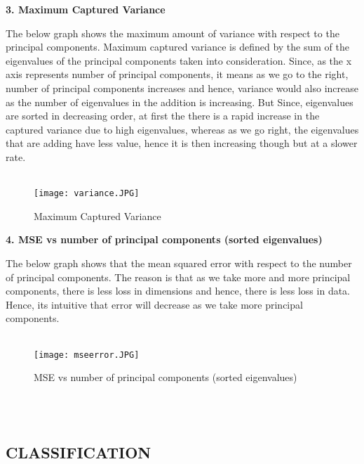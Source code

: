 \documentclass{article}
\begin{document}
    \newpage
    \textbf{ 3. Maximum Captured Variance  } 
    \begin{itemize}
       
       The below graph shows the maximum amount of variance with respect to the principal components. Maximum captured variance is defined by the sum of the eigenvalues of the principal components taken into consideration. Since, as the x axis represents number of principal components, it means as we go to the right, number of principal components increases and hence, variance would also increase as the number of eigenvalues in the addition is increasing. But Since, eigenvalues are sorted in decreasing order, at first the there is a rapid increase in the captured variance due to high eigenvalues, whereas as we go right, the eigenvalues that are adding have less value, hence it is then increasing though but at a slower rate. \\ \\
   
     \begin{figure}[H]
     \centering
      \texttt{[image: variance.JPG]}
    \caption{Maximum Captured Variance }
    \label{fig:Caption}
    \end{figure}

    \end{itemize}
    
   \newpage
    \textbf{ 4. MSE vs number of principal components (sorted eigenvalues) } 
    \begin{itemize}
       
       The below graph shows that the mean squared error with respect to the number of principal components. The reason is that as we take more and more principal components, there is less loss in dimensions and hence, there is less loss in data. Hence, its intuitive that error will decrease as we take more principal components.  \\ \\
        \begin{figure}[H]
        \centering
    \texttt{[image: mseerror.JPG]}
    \caption{ MSE vs number of principal components (sorted eigenvalues) }
    \label{fig:Caption}
    \end{figure}
    \end{itemize}
\\ \\


\newpage
\subsection {\color{blue}
\textbf{CLASSIFICATION}} \\ \\
\end{document}
